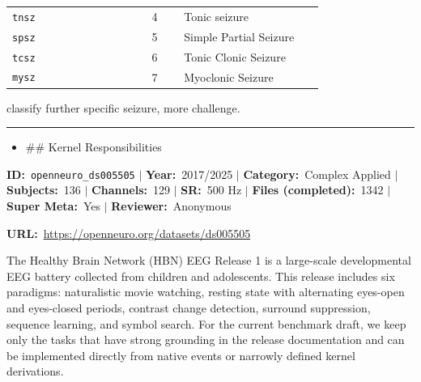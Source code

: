 {\begin{tcolorbox}
\begin{tabular}{@{}p{0.3911\linewidth}p{0.0978\linewidth}p{0.3911\linewidth}@{}}
\texttt{tnsz} & 4 & Tonic seizure \\
\texttt{spsz} & 5 & Simple Partial Seizure \\
\texttt{tcsz} & 6 & Tonic Clonic Seizure \\
\texttt{mysz} & 7 & Myoclonic Seizure \\
\bottomrule
\end{tabular}
\endgroup
\par{} {\footnotesize classify further specific seizure, more challenge.}
\par\smallskip
\noindent\rule{\linewidth}{0.4pt}\par\nopagebreak
{}\par\smallskip
\begin{itemize}[leftmargin=1.4em,noitemsep,topsep=2pt]
\item{\footnotesize \#\# Kernel Responsibilities}
\end{itemize}
\end{tcolorbox}
\vspace{3pt}
\noindent\begin{tcolorbox}[breakable,enhanced,colback=white,colframe=gray!55,boxrule=0.9pt,arc=4pt,left=6pt,right=6pt,top=4pt,bottom=4pt,title={\small\bfseries Healthy Brain Network (HBN) EEG - Release 1\hfill \colorbox{gray!20}{\scriptsize\sffamily\bfseries Completed}},coltitle=black,colbacktitle=gray!12,titlerule=0.5pt]
{\footnotesize \textbf{ID:}~\texttt{openneuro\_ds005505} $\mid$ \textbf{Year:}~2017/2025 $\mid$ \textbf{Category:}~Complex Applied $\mid$ \textbf{Subjects:}~136 $\mid$ \textbf{Channels:}~129 $\mid$ \textbf{SR:}~500 Hz $\mid$ \textbf{Files (completed):}~1342 $\mid$ \textbf{Super Meta:}~Yes $\mid$ \textbf{Reviewer:}~Anonymous}
\par{\footnotesize\textbf{URL:}~\url{https://openneuro.org/datasets/ds005505}}
\tcbline
{}\par\smallskip
{\footnotesize The Healthy Brain Network (HBN) EEG Release 1 is a large-scale developmental EEG battery collected from children and adolescents. This release includes six paradigms: naturalistic movie watching, resting state with alternating eyes-open and eyes-closed periods, contrast change detection, surround suppression, sequence learning, and symbol search. For the current benchmark draft, we keep only the tasks that have strong grounding in the release documentation and can be implemented directly from native events or narrowly defined kernel derivations.}

\end{tcolorbox}}
